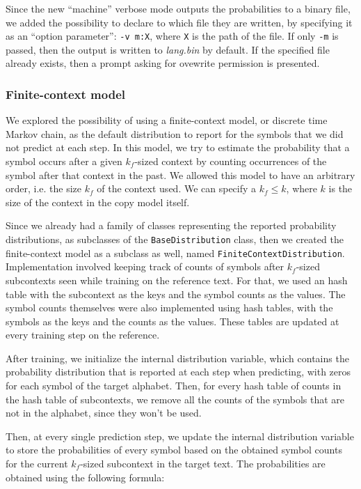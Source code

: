 \documentclass{article}
\begin{document}
Since the new ``machine'' verbose mode outputs the probabilities to a binary file, we added the possibility to declare to which file they are written, by specifying it as an ``option parameter'': \verb|-v m:X|, where \texttt{X} is the path of the file.
If only \texttt{-m} is passed, then the output is written to \textit{lang.bin} by default.
If the specified file already exists, then a prompt asking for ovewrite permission is presented.

\subsubsection{Finite-context model}
\label{subsubsec:methodology_lang_model_fcm}

We explored the possibility of using a finite-context model, or discrete time Markov chain, as the default distribution to report for the symbols that we did not predict at each step.
In this model, we try to estimate the probability that a symbol occurs after a given $k_f$-sized context by counting occurrences of the symbol after that context in the past.
We allowed this model to have an arbitrary order, i.e. the size $k_f$ of the context used.
We can specify a $k_f \leq k$, where $k$ is the size of the context in the copy model itself.

Since we already had a family of classes representing the reported probability distributions, as subclasses of the \texttt{BaseDistribution} class, then we created the finite-context model as a subclass as well, named \texttt{FiniteContextDistribution}.
Implementation involved keeping track of counts of symbols after $k_f$-sized subcontexts seen while training on the reference text.
For that, we used an hash table with the subcontext as the keys and the symbol counts as the values.
The symbol counts themselves were also implemented using hash tables, with the symbols as the keys and the counts as the values.
These tables are updated at every training step on the reference.

After training, we initialize the internal distribution variable, which contains the probability distribution that is reported at each step when predicting, with zeros for each symbol of the target alphabet.
Then, for every hash table of counts in the hash table of subcontexts, we remove all the counts of the symbols that are not in the alphabet, since they won't be used.

Then, at every single prediction step, we update the internal distribution variable to store the probabilities of every symbol based on the obtained symbol counts for the current $k_f$-sized subcontext in the target text.
The probabilities are obtained using the following formula:
\end{document}
